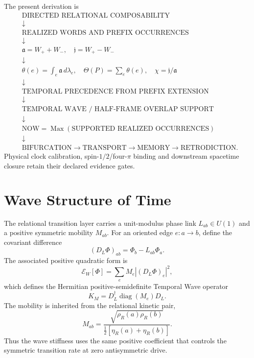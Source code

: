 The present derivation is
\[
\boxed{
\begin{aligned}
&\text{DIRECTED RELATIONAL COMPOSABILITY}\\
&\downarrow\\
&\text{REALIZED WORDS AND PREFIX OCCURRENCES}\\
&\downarrow\\
&\mathfrak a=W_++W_-,\quad \mathfrak j=W_+-W_-\\
&\downarrow\\
&\theta(e)=\int_e\mathfrak a\,d\lambda_e,\quad
\Theta(P)=\sum_e\theta(e),\quad
\chi=\mathfrak j/\mathfrak a\\
&\downarrow\\
&\text{TEMPORAL PRECEDENCE FROM PREFIX EXTENSION}\\
&\downarrow\\
&\text{TEMPORAL WAVE / HALF-FRAME OVERLAP SUPPORT}\\
&\downarrow\\
&\text{NOW}=\operatorname{Max}(\text{SUPPORTED REALIZED OCCURRENCES})\\
&\downarrow\\
&\text{BIFURCATION}\to\text{TRANSPORT}\to\text{MEMORY}\to\text{RETRODICTION}.
\end{aligned}
}
\]
Physical clock calibration, spin-$1/2$/four-$\pi$ binding and downstream spacetime closure retain their declared evidence gates.


\chapter{Wave Structure of Time}

The relational transition layer carries a unit-modulus phase link $L_{ab}\in U(1)$ and a positive symmetric mobility $M_{ab}$.  For an oriented edge $e:a\to b$, define the covariant difference
\[
(D_L\Phi)_{ab}=\Phi_b-L_{ab}\Phi_a.
\]
The associated positive quadratic form is
\[
\mathcal E_W[\Phi]
=\sum_e M_e |(D_L\Phi)_e|^2,
\]
which defines the Hermitian positive-semidefinite Temporal Wave operator
\[
\boxed{
K_M=D_L^\dagger\operatorname{diag}(M_e)D_L.
}
\]
The mobility is inherited from the relational kinetic pair,
\[
M_{ab}
=\frac{\sqrt{\rho_R(a)\rho_R(b)}}{\tfrac12[\eta_R(a)+\eta_R(b)]}.
\]
Thus the wave stiffness uses the same positive coefficient that controls the symmetric transition rate at zero antisymmetric drive.

